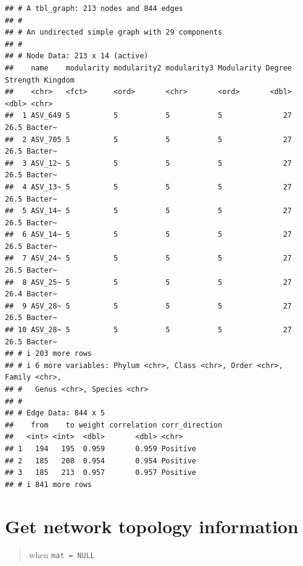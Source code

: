 \documentclass[
]{book}
\begin{document}
\begin{verbatim}
## # A tbl_graph: 213 nodes and 844 edges
## #
## # An undirected simple graph with 29 components
## #
## # Node Data: 213 x 14 (active)
##    name    modularity modularity2 modularity3 Modularity Degree Strength Kingdom
##    <chr>   <fct>      <ord>       <chr>       <ord>       <dbl>    <dbl> <chr>  
##  1 ASV_649 5          5           5           5              27     26.5 Bacter~
##  2 ASV_705 5          5           5           5              27     26.5 Bacter~
##  3 ASV_12~ 5          5           5           5              27     26.5 Bacter~
##  4 ASV_13~ 5          5           5           5              27     26.5 Bacter~
##  5 ASV_14~ 5          5           5           5              27     26.5 Bacter~
##  6 ASV_14~ 5          5           5           5              27     26.5 Bacter~
##  7 ASV_24~ 5          5           5           5              27     26.5 Bacter~
##  8 ASV_25~ 5          5           5           5              27     26.4 Bacter~
##  9 ASV_28~ 5          5           5           5              27     26.5 Bacter~
## 10 ASV_28~ 5          5           5           5              27     26.5 Bacter~
## # i 203 more rows
## # i 6 more variables: Phylum <chr>, Class <chr>, Order <chr>, Family <chr>,
## #   Genus <chr>, Species <chr>
## #
## # Edge Data: 844 x 5
##    from    to weight correlation corr_direction
##   <int> <int>  <dbl>       <dbl> <chr>         
## 1   194   195  0.959       0.959 Positive      
## 2   185   208  0.954       0.954 Positive      
## 3   185   213  0.957       0.957 Positive      
## # i 841 more rows
\end{verbatim}

\section{Get network topology information}\label{get-network-topology-information}

\begin{quote}
when \texttt{mat\ =\ NULL}
\end{quote}
\end{document}
